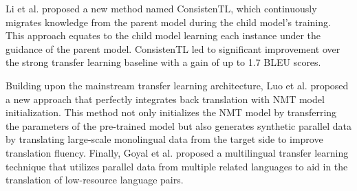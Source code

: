 \documentclass[acmsmall]{acmart}
\begin{document}
Li et al. \cite{n4-66} proposed a new method named ConsistenTL, which continuously migrates knowledge from the parent model during the child model's training. This approach equates to the child model learning each instance under the guidance of the parent model. ConsistenTL led to significant improvement over the strong transfer learning baseline with a gain of up to 1.7 BLEU scores.

Building upon the mainstream transfer learning architecture, Luo et al. \cite{n4-67} proposed a new approach that perfectly integrates back translation with NMT model initialization. This method not only initializes the NMT model by transferring the parameters of the pre-trained model but also generates synthetic parallel data by translating large-scale monolingual data from the target side to improve translation fluency. Finally, Goyal et al. \cite{n4-68} proposed a multilingual transfer learning technique that utilizes parallel data from multiple related languages to aid in the translation of low-resource language pairs.
\end{document}
